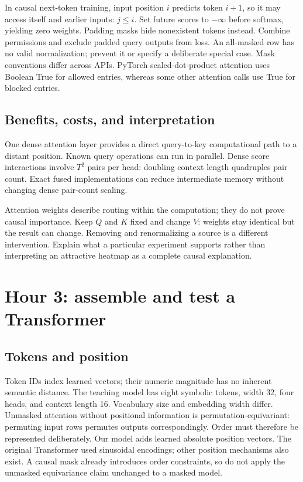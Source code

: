 In causal next-token training, input position $i$ predicts token $i+1$,
so it may access itself and earlier inputs: $j\le i$. Set future scores
to $-\infty$ before softmax, yielding zero weights. Padding masks hide
nonexistent tokens instead. Combine permissions and exclude padded query
outputs from loss. An all-masked row has no valid normalization; prevent
it or specify a deliberate special case. Mask conventions differ across
APIs. PyTorch scaled-dot-product attention uses Boolean True for allowed
entries, whereas some other attention calls use True for blocked entries.

\subsection{Benefits, costs, and interpretation}
One dense attention layer provides a direct query-to-key computational
path to a distant position. Known query operations can run in parallel.
Dense score interactions involve $T^2$ pairs per head: doubling context
length quadruples pair count. Exact fused implementations can reduce
intermediate memory without changing dense pair-count scaling.

Attention weights describe routing within the computation; they do not
prove causal importance. Keep $Q$ and $K$ fixed and change $V$: weights
stay identical but the result can change. Removing and renormalizing a
source is a different intervention. Explain what a particular experiment
supports rather than interpreting an attractive heatmap as a complete
causal explanation.

\section{Hour 3: assemble and test a Transformer}
\subsection{Tokens and position}
Token IDs index learned vectors; their numeric magnitude has no inherent
semantic distance. The teaching model has eight symbolic tokens, width 32,
four heads, and context length 16. Vocabulary size and embedding width differ.
Unmasked attention without positional information is permutation-equivariant:
permuting input rows permutes outputs correspondingly. Order must therefore
be represented deliberately. Our model adds learned absolute position
vectors. The original Transformer used sinusoidal encodings; other position
mechanisms also exist. A causal mask already introduces order constraints,
so do not apply the unmasked equivariance claim unchanged to a masked model.

